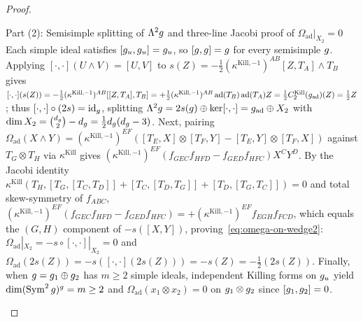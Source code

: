 \begin{proof}
\begin{proofpart}{Part (2): Semisimple splitting of $\Lambda^2g$ and three-line Jacobi proof of $\Omega_{\mathrm{ad}}|_{X_2} = 0$}
Each simple ideal satisfies $[g_u,g_u] = g_u$, so $[g,g] = g$ for every semisimple $g$. Applying $[\cdot,\cdot](U\wedge V) = [U,V]$ to $s(Z) = -\frac{1}{2}(\kappa^{\mathrm{Kill},-1})^{AB}[Z,T_A]\wedge T_B$ gives $[\cdot,\cdot](s(Z)) = -\frac{1}{2}(\kappa^{\mathrm{Kill},-1})^{AB}[[Z,T_A],T_B] = +\frac{1}{2}(\kappa^{\mathrm{Kill},-1})^{AB}\operatorname{ad}(T_B)\operatorname{ad}(T_A)Z = \frac{1}{2}C_2^{\mathrm{Kill}}(g_{\mathrm{ad}})(Z) = \frac{1}{2}Z$; thus $[\cdot,\cdot]\circ(2s) = \operatorname{id}_{g}$, splitting $\Lambda^2g = 2s(g)\oplus\ker[\cdot,\cdot] = g_{\mathrm{ad}}\oplus X_2$ with $\dim X_2 = \binom{d_{g}}{2} - d_{g} = \frac{1}{2}d_{g}(d_{g}-3)$. Next, pairing $\Omega_{\mathrm{ad}}(X\wedge Y) = (\kappa^{\mathrm{Kill},-1})^{EF}([T_E,X]\otimes[T_F,Y] - [T_E,Y]\otimes[T_F,X])$ against $T_G\otimes T_H$ via $\kappa^{\mathrm{Kill}}$ gives $(\kappa^{\mathrm{Kill},-1})^{EF}(f_{GEC}f_{HFD} - f_{GED}f_{HFC})X^C Y^D$. By the Jacobi identity $\kappa^{\mathrm{Kill}}(T_H, [T_G,[T_C,T_D]] + [T_C,[T_D,T_G]] + [T_D,[T_G,T_C]]) = 0$ and total skew-symmetry of $f_{ABC}$, $(\kappa^{\mathrm{Kill},-1})^{EF}(f_{GEC}f_{HFD} - f_{GED}f_{HFC}) = +(\kappa^{\mathrm{Kill},-1})^{EF}f_{EGH}f_{FCD}$, which equals the $(G,H)$ component of $-s([X,Y])$, proving~\eqref{eq:omega-on-wedge2}: $\Omega_{\mathrm{ad}}|_{X_2} = -s\circ[\cdot,\cdot]|_{X_2} = 0$ and $\Omega_{\mathrm{ad}}(2s(Z)) = -s([\cdot,\cdot](2s(Z))) = -s(Z) = -\frac{1}{2}(2s(Z))$. Finally, when $g = g_1\oplus g_2$ has $m \ge 2$ simple ideals, independent Killing forms on $g_u$ yield $\dim(\operatorname{Sym}^2g)^{g} = m \ge 2$ and $\Omega_{\mathrm{ad}}(x_1\otimes x_2) = 0$ on $g_1\otimes g_2$ since $[g_1,g_2] = 0$.
\end{proofpart}
\end{proof}

